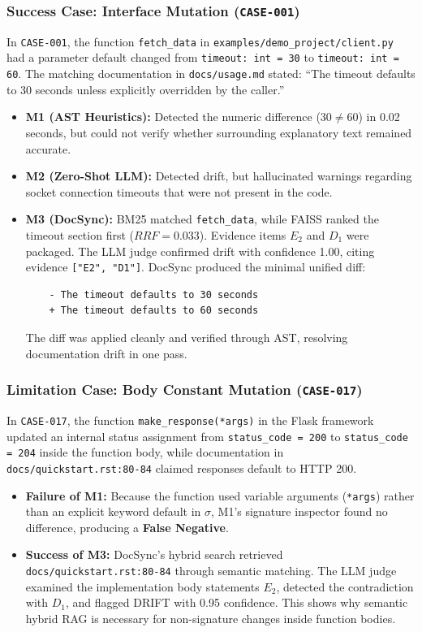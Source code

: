 \documentclass[12pt,onecolumn,draftclsnofoot]{IEEEtran}
\begin{document}
\subsubsection{Success Case: Interface Mutation (\texttt{CASE-001})}
In \texttt{CASE-001}, the function \texttt{fetch\_data} in \texttt{examples/demo\_project/client.py} had a parameter default changed from \texttt{timeout: int = 30} to \texttt{timeout: int = 60}. The matching documentation in \texttt{docs/usage.md} stated: ``The timeout defaults to 30 seconds unless explicitly overridden by the caller.''
\begin{itemize}
    \item \textbf{M1 (AST Heuristics):} Detected the numeric difference ($30 \neq 60$) in 0.02 seconds, but could not verify whether surrounding explanatory text remained accurate.
    \item \textbf{M2 (Zero-Shot LLM):} Detected drift, but hallucinated warnings regarding socket connection timeouts that were not present in the code.
    \item \textbf{M3 (DocSync):} BM25 matched \texttt{fetch\_data}, while FAISS ranked the timeout section first ($RRF = 0.033$). Evidence items $E_2$ and $D_1$ were packaged. The LLM judge confirmed drift with confidence 1.00, citing evidence \texttt{["E2", "D1"]}. DocSync produced the minimal unified diff:
    \begin{verbatim}
    - The timeout defaults to 30 seconds
    + The timeout defaults to 60 seconds
    \end{verbatim}
    The diff was applied cleanly and verified through AST, resolving documentation drift in one pass.
\end{itemize}

\subsubsection{Limitation Case: Body Constant Mutation (\texttt{CASE-017})}
In \texttt{CASE-017}, the function \texttt{make\_response(*args)} in the Flask framework updated an internal status assignment from \texttt{status\_code = 200} to \texttt{status\_code = 204} inside the function body, while documentation in \texttt{docs/quickstart.rst:80-84} claimed responses default to HTTP 200.
\begin{itemize}
    \item \textbf{Failure of M1:} Because the function used variable arguments (\texttt{*args}) rather than an explicit keyword default in $\sigma$, M1's signature inspector found no difference, producing a \textbf{False Negative}.
    \item \textbf{Success of M3:} DocSync's hybrid search retrieved \texttt{docs/quickstart.rst:80-84} through semantic matching. The LLM judge examined the implementation body statements $E_2$, detected the contradiction with $D_1$, and flagged DRIFT with 0.95 confidence. This shows why semantic hybrid RAG is necessary for non-signature changes inside function bodies.
\end{itemize}
\end{document}
